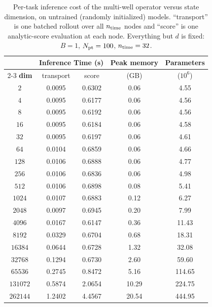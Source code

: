 \documentclass[preprint]{elsarticle}
\begin{document}
\begin{table}[htpb]
    \centering
    \caption{Per-task inference cost of the multi-well operator versus state
    dimension, on untrained (randomly initialized) models. ``transport'' is
    one batched rollout over all $n_{\rm time}$ nodes and ``score'' is one
    analytic-score evaluation at each node. Everything but $d$ is fixed:
    $B=1$, $N_{\rm pt}=100$, $n_{\rm time}=32$.}
    \label{tab:dim_timing}
    \begin{tabular}{ccccc}
        \toprule
         & \multicolumn{2}{c}{\textbf{Inference Time (s)}}
            & \textbf{Peak memory} & \textbf{Parameters} \\
        \cmidrule(lr){2-3}
        \textbf{dim} & transport & score & (GB) & ($10^6$) \\
        \midrule
        $2$ & 0.0095 & 0.6302 & 0.06 & 4.55 \\
        $4$ & 0.0095 & 0.6177 & 0.06 & 4.56 \\
        $8$ & 0.0095 & 0.6192 & 0.06 & 4.56 \\
        $16$ & 0.0095 & 0.6184 & 0.06 & 4.58 \\
        $32$ & 0.0095 & 0.6197 & 0.06 & 4.61 \\
        $64$ & 0.0104 & 0.6859 & 0.06 & 4.66 \\
        $128$ & 0.0106 & 0.6888 & 0.06 & 4.77 \\
        $256$ & 0.0106 & 0.6836 & 0.06 & 4.98 \\
        $512$ & 0.0106 & 0.6898 & 0.08 & 5.41 \\
        $1024$ & 0.0107 & 0.6883 & 0.12 & 6.27 \\
        $2048$ & 0.0097 & 0.6945 & 0.20 & 7.99 \\
        $4096$ & 0.0167 & 0.6147 & 0.36 & 11.43 \\
        $8192$ & 0.0329 & 0.6704 & 0.68 & 18.31 \\
        $16384$ & 0.0644 & 0.6728 & 1.32 & 32.08 \\
        $32768$ & 0.1294 & 0.6730 & 2.60 & 59.60 \\
        $65536$ & 0.2745 & 0.8472 & 5.16 & 114.65 \\
        $131072$ & 0.5874 & 2.0654 & 10.29 & 224.75 \\
        $262144$ & 1.2402 & 4.4567 & 20.54 & 444.95 \\
        \bottomrule
    \end{tabular}
\end{table}
\end{document}
